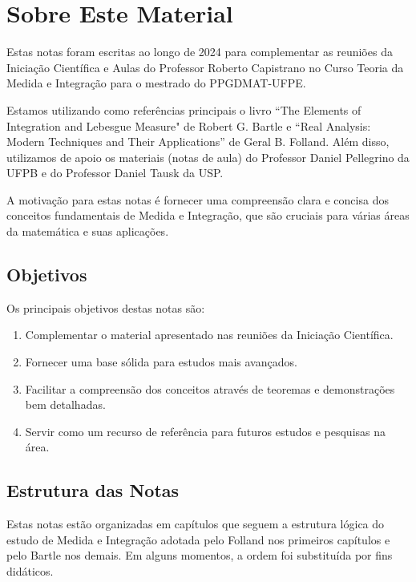 \chapter*{Sobre Este Material}

Estas notas foram escritas ao longo de 2024 para complementar as reuniões da Iniciação Científica e Aulas do Professor Roberto Capistrano no Curso Teoria da Medida e Integração para o mestrado do PPGDMAT-UFPE. 

Estamos utilizando como referências principais o livro ``The Elements of Integration and Lebesgue Measure" de Robert G. Bartle e ``Real Analysis: Modern Techniques and Their Applications'' de Geral B. Folland. Além disso, utilizamos de apoio os materiais (notas de aula) do Professor Daniel Pellegrino da UFPB e do Professor Daniel Tausk da USP.

A motivação para estas notas é fornecer uma compreensão clara e concisa dos conceitos fundamentais de Medida e Integração, que são cruciais para várias áreas da matemática e suas aplicações.

\section*{Objetivos}

Os principais objetivos destas notas são:

\begin{enumerate}
    \item Complementar o material apresentado nas reuniões da Iniciação Científica.
    \item Fornecer uma base sólida para estudos mais avançados.
    \item Facilitar a compreensão dos conceitos através de teoremas e demonstrações bem detalhadas.
    \item Servir como um recurso de referência para futuros estudos e pesquisas na área.
\end{enumerate}

\section*{Estrutura das Notas}

Estas notas estão organizadas em capítulos que seguem a estrutura lógica do estudo de Medida e Integração adotada pelo Folland nos primeiros capítulos e pelo Bartle nos demais. Em alguns momentos, a ordem foi substituída por fins didáticos.

